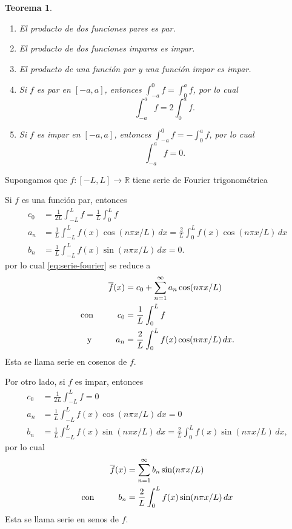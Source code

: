 \documentclass[11pt,letterpaper]{report}
\newtheorem{theorem}[defn]{Teorema}
\newcommand\R{\mathbb R}
\newcommand\<{\langle}
\renewcommand\>{\rangle}
\begin{document}
\begin{theorem}
  \begin{enumerate}
    \item El producto de dos funciones pares es par.
    \item El producto de dos funciones impares es impar.
    \item El producto de una función par y una función impar es impar.
    \item Si $f$ es par en $[-a,a]$, entonces
      $\int_{-a}^{0}f=\int_{0}^{a}f$, por lo cual
      \[
        \int_{-a}^{a}f = 2\int_{0}^{a}f
      .\]
    \item Si $f$ es impar en $[-a,a]$, entonces
      $\int_{-a}^{0}f=-\int_{0}^{a}f$, por lo cual
      \[
        \int_{-a}^{a}f = 0
      .\]
  \end{enumerate}
\end{theorem}

Supongamos que $f:[-L,L]\to\R$ tiene serie de Fourier trigonométrica

Si $f$ es una función par, entonces
\begin{align*}
  c_0 &= \frac{1}{2L}\int_{-L}^L f = \frac{1}{L}\int_{0}^L f \\
  a_n
    &= \frac{1}{L}\int_{-L}^L f(x)\cos(n\pi x/L)\,dx
    = \frac{2}{L}\int_{0}^L f(x)\cos(n\pi x/L)\,dx \\
  b_n
    &= \frac{1}{L}\int_{-L}^L f(x)\sin(n\pi x/L)\,dx
    = 0.
\end{align*}
por lo cual \eqref{eq:serie-fourier} se reduce a
\begin{equation}\label{eq:fourier-par}
\begin{aligned}
  \overline{f}(x)
  &=
  c_0
  +
  \sum_{n=1}^{\infty}a_n\cos(n\pi x/L) \\
  \text{con} \hspace{10mm}
  c_0 &= \frac{1}{L}\int_{0}^L f \\
  \text{y} \hspace{10mm}
  a_n &= \frac{2}{L}\int_{0}^L f(x)\cos(n\pi x/L)\,dx.
\end{aligned}
\end{equation}
Esta se llama serie en cosenos de $f$.

Por otro lado, si $f$ es impar, entonces
\begin{align*}
  c_0 &= \frac{1}{2L}\int_{-L}^L f = 0 \\
  a_n
    &= \frac{1}{L}\int_{-L}^L f(x)\cos(n\pi x/L)\,dx
    = 0 \\
  b_n
    &= \frac{1}{L}\int_{-L}^L f(x)\sin(n\pi x/L)\,dx
    = \frac{2}{L}\int_{0}^L f(x)\sin(n\pi x/L)\,dx,
\end{align*}
por lo cual
\begin{equation}\label{eq:fourier-impar}
\begin{aligned}
  \overline{f}(x)
  &=
  \sum_{n=1}^{\infty}b_n\sin(n\pi x/L) \\
  \text{con}\hspace{10mm}
  b_n
  &= \frac{2}{L}\int_{0}^L f(x)\sin(n\pi x/L)\,dx
\end{aligned}
\end{equation}
Esta se llama serie en senos de $f$.
\end{document}
